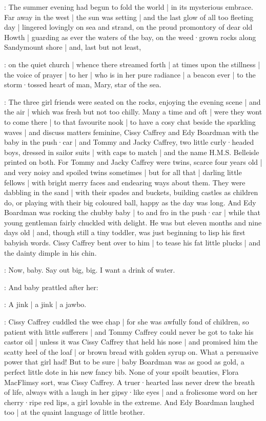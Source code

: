 \Nnovel:
The summer evening
had begun to fold the world |
in its mysterious embrace.
Far away in the west |
the sun was setting |
and the last glow of all too fleeting day |
lingered lovingly on sea and strand,
on the proud promontory
of dear old Howth |
guarding as ever
the waters of the bay,
on the weed·grown rocks along Sandymount shore |
and,
last but not least,

\Nrelig:
on the quiet church |
whence there streamed forth |
at times upon the stillness |
the voice of prayer |
to her |
who is in her pure radiance |
a beacon ever |
to the storm·tossed heart of man,
Mary,
star of the sea.

\Nnovel:
The three girl friends were seated on the rocks,
enjoying the evening scene |
and the air |
which was fresh but not too chilly.%
Many a time and oft |
were they wont to come there |
to that favourite nook |
to have a cosy chat
beside the sparkling waves |
and discuss matters feminine,
Cissy Caffrey
and Edy Boardman with the baby in the push·car |
and Tommy and Jacky Caffrey,
two little curly·headed boys,
dressed in sailor suits |
with caps to match |
and the name H.M.S. Belleisle printed on both.
For Tommy and Jacky Caffrey were twins,
scarce four years old |
and very noisy and spoiled twins sometimes |
but for all that |
darling little fellows |
with bright merry faces and endearing ways about them.
They were dabbling in the sand |
with their spades and buckets,
building castles as children do,
or playing with their big coloured ball,
happy as the day was long.%
And Edy Boardman was rocking the chubby baby |
to and fro in the push·car |
while that young gentleman
fairly chuckled with delight.
He was but eleven months and nine days old |
and,
though still a tiny toddler,
was just beginning to lisp his first babyish words.
Cissy Caffrey bent over to him |
to tease his fat little plucks |
and the dainty dimple in his chin.

\cissy:
Now,
baby.
Say out big,
big.
I want a drink of water.

:
And baby prattled after her:

\baby:
A jink |
a jink |
a jawbo.

:
Cissy Caffrey cuddled the wee chap |
for she was awfully fond of children,
so patient with little sufferers |%
and Tommy Caffrey could never be got to take his castor oil |
unless it was Cissy Caffrey that held his nose |
and promised him the scatty heel of the loaf |
or brown bread with golden syrup on.
What a persuasive power that girl had!
But to be sure |
baby Boardman was as good as gold,
a perfect little dote in his new fancy bib.
None of your spoilt beauties,
Flora MacFlimsy sort,
was Cissy Caffrey.
A truer·hearted lass never drew the breath of life,
always with a laugh in her gipsy·like eyes |
and a frolicsome word on her cherry·ripe red lips,
a girl lovable in the extreme.
And Edy Boardman laughed too |
at the quaint language of little brother.

